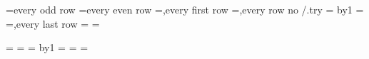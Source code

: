 {			\pgfplotslistcheckempty\pgfplotstable@col@processed
			\ifpgfplotslistempty
				\pgfplots@loop@CONTINUEfalse
			\else
				\ifnum{}\relax
					\begingroup
					\ifodd\c@pgfplotstable@rowindex
						\t@pgfplots@toka={every odd row}%
					\else
						\t@pgfplots@toka={every even row}%
					\fi
					\ifnum{}\relax
						\t@pgfplots@toka=\expandafter{\the\t@pgfplots@toka,every first row}%
					\fi
					\ifpgfplotstable@disable@rowcolstyles
					\else
						\edef\pgfplotstable@loc@TMPa{\the\t@pgfplots@toka,every row no \the\c@pgfplotstable@rowindex/.try}%
						\t@pgfplots@toka=\expandafter{\pgfplotstable@loc@TMPa}%
					\fi
					\c@pgfplotstable@colindex=\c@pgfplotstable@rowindex
					\advance\c@pgfplotstable@colindex by1\relax
					\ifnum\c@pgfplotstable@colindex=\c@pgfplotstable@numrows
						\t@pgfplots@toka=\expandafter{\the\t@pgfplots@toka,every last row}%
					\fi
					\expandafter\pgfplotstableset\expandafter{\the\t@pgfplots@toka}%
					\t@pgfplots@toka=\expandafter{\pgfplotstable@before}%
					\t@pgfplots@tokb=\expandafter{\pgfplotstable@after}%
					\xdef\pgfplots@glob@TMPc{%
						\noexpand\def\noexpand\pgfplotstable@before{\the\t@pgfplots@toka}%
						\noexpand\def\noexpand\pgfplotstable@after{\the\t@pgfplots@tokb}%
					}%
					\endgroup
					\pgfplots@glob@TMPc
					\t@pgfplots@toka=\expandafter{\pgfplotstable@before}%
					\t@pgfplots@tokb=\expandafter{\pgfplotstable@curline}%
					\edef\pgfplotstable@curline{\the\t@pgfplots@tokb\the\t@pgfplots@toka}%
				\fi
				\pgfplotslistpopfront\pgfplotstable@col@processed\to\pgfplotstable@entry
				\pgfplotsarrayletentry\c@pgfplotstable@colindex\of\pgfplotstabletypeset@final@cols@array=\pgfplotstable@col@processed
				\advance\c@pgfplotstable@colindex by1\relax
				\pgfplots@loc@TMPa
				\expandafter\pgfplots@loc@TMPa\pgfplotstable@entry\pgfeov
				\pgfmathresult
				\t@pgfplots@toka=\expandafter{\pgfplotstable@curline}%
				\t@pgfplots@tokb=\expandafter{\pgfmathresult}%
				\edef\pgfplotstable@curline{\the\t@pgfplots@toka\the\t@pgfplots@tokb}%
				\ifnum\c@pgfplotstable@colindex=\c@pgfplotstable@numcols\relax
}
